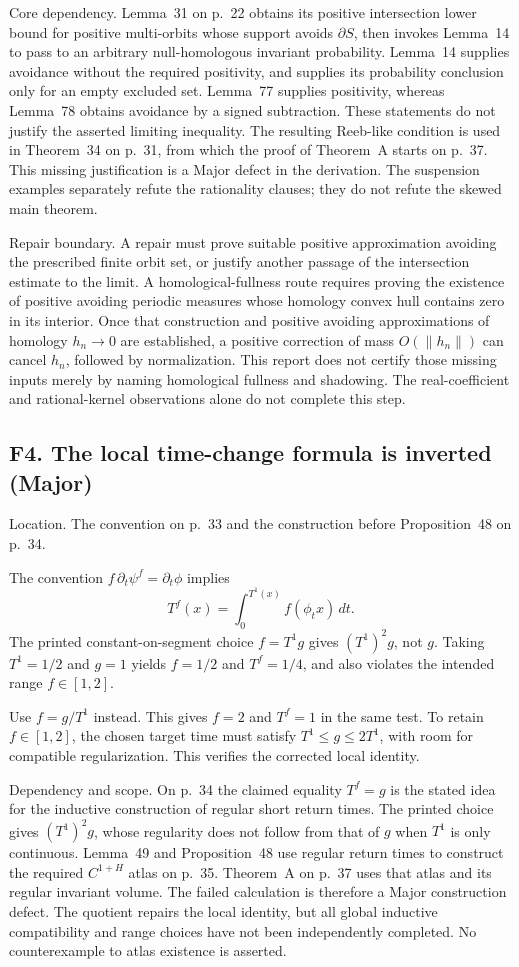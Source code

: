\documentclass[10pt]{article}
\begin{document}
Core dependency. Lemma 31 on p. 22 obtains its positive intersection lower bound for positive multi-orbits whose support avoids \(\partial S\), then invokes Lemma 14 to pass to an arbitrary null-homologous invariant probability. Lemma 14 supplies avoidance without the required positivity, and supplies its probability conclusion only for an empty excluded set. Lemma 77 supplies positivity, whereas Lemma 78 obtains avoidance by a signed subtraction. These statements do not justify the asserted limiting inequality. The resulting Reeb-like condition is used in Theorem 34 on p. 31, from which the proof of Theorem A starts on p. 37. This missing justification is a Major defect in the derivation. The suspension examples separately refute the rationality clauses; they do not refute the skewed main theorem.\par
Repair boundary. A repair must prove suitable positive approximation avoiding the prescribed finite orbit set, or justify another passage of the intersection estimate to the limit. A homological-fullness route requires proving the existence of positive avoiding periodic measures whose homology convex hull contains zero in its interior. Once that construction and positive avoiding approximations of homology \(h_n\to0\) are established, a positive correction of mass \(O(\|h_n\|)\) can cancel \(h_n\), followed by normalization. This report does not certify those missing inputs merely by naming homological fullness and shadowing. The real-coefficient and rational-kernel observations alone do not complete this step.\par
\subsection*{F4. The local time-change formula is inverted (Major)}
Location. The convention on p. 33 and the construction before Proposition 48 on p. 34.\par
The convention \(f\,\partial_t\psi^f=\partial_t\phi\) implies \[T^f(x)=\int_0^{T^1(x)} f(\phi_t x)\,dt.\] The printed constant-on-segment choice \(f=T^1g\) gives \((T^1)^2g\), not \(g\). Taking \(T^1=1/2\) and \(g=1\) yields \(f=1/2\) and \(T^f=1/4\), and also violates the intended range \(f\in[1,2]\).\par
Use \(f=g/T^1\) instead. This gives \(f=2\) and \(T^f=1\) in the same test. To retain \(f\in[1,2]\), the chosen target time must satisfy \(T^1\le g\le2T^1\), with room for compatible regularization. This verifies the corrected local identity.\par
Dependency and scope. On p. 34 the claimed equality \(T^f=g\) is the stated idea for the inductive construction of regular short return times. The printed choice gives \((T^1)^2g\), whose regularity does not follow from that of \(g\) when \(T^1\) is only continuous. Lemma 49 and Proposition 48 use regular return times to construct the required \(C^{1+H}\) atlas on p. 35. Theorem A on p. 37 uses that atlas and its regular invariant volume. The failed calculation is therefore a Major construction defect. The quotient repairs the local identity, but all global inductive compatibility and range choices have not been independently completed. No counterexample to atlas existence is asserted.\par
\end{document}
